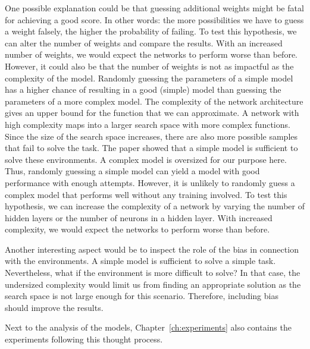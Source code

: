 One possible explanation could be that guessing additional weights might be fatal for achieving a good score. In other words: the more possibilities we have to guess a weight falsely, the higher the probability of failing. To test this hypothesis, we can alter the number of weights and compare the results. With an increased number of weights, we would expect the networks to perform worse than before. However, it could also be that the number of weights is not as impactful as the complexity of the model. Randomly guessing the parameters of a simple model has a higher chance of resulting in a good (simple) model than guessing the parameters of a more complex model. The complexity of the network architecture gives an upper bound for the function that we can approximate. A network with high complexity maps into a larger search space with more complex functions. Since the size of the search space increases, there are also more possible samples that fail to solve the task. The paper showed that a simple model is sufficient to solve these environments. A complex model is oversized for our purpose here. Thus, randomly guessing a simple model can yield a model with good performance with enough attempts. However, it is unlikely to randomly guess a complex model that performs well without any training involved. To test this hypothesis, we can increase the complexity of a network by varying the number of hidden layers or the number of neurons in a hidden layer. With increased complexity, we would expect the networks to perform worse than before.

Another interesting aspect would be to inspect the role of the bias in connection with the environments. A simple model is sufficient to solve a simple task. Nevertheless, what if the environment is more difficult to solve? In that case, the undersized complexity would limit us from finding an appropriate solution as the search space is not large enough for this scenario. Therefore, including bias should improve the results.

Next to the analysis of the models, Chapter~\ref{ch:experiments} also contains the experiments following this thought process.

